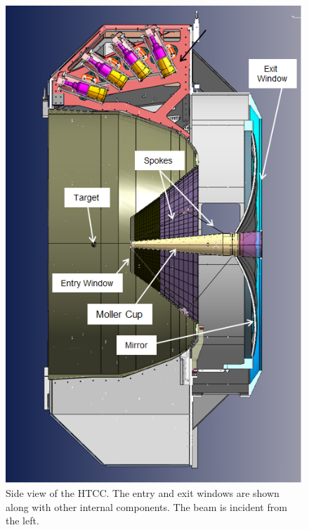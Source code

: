 \begin{figure}[ht]
    \centering
    \includegraphics[trim={1.5cm 5cm 0 2cm }, clip, width=\linewidth]{images/Spokes2.png}
    \caption{Side view of the HTCC. The  entry and exit windows are shown along with other internal components.
    The beam is incident from the left.}
    \label{fig:side_view}
\end{figure}

